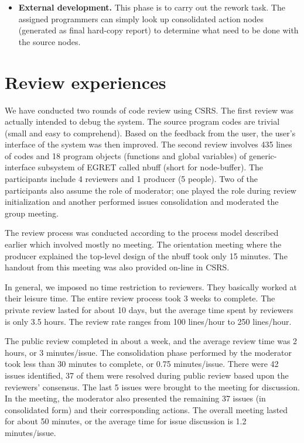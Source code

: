 \begin {itemize}
This phase is also used to generate or refine standard issues
by analyzing the identified errors as described in the previous section.

\item {\bf External development.}
This phase is to carry out the rework task. The assigned programmers can
simply look up consolidated action nodes (generated as final hard-copy
report) to determine what need to be done with the source nodes.

\end {itemize}

\section {Review experiences}

We have conducted two rounds of code review using CSRS.  The
first review was actually intended to debug the system. The
source program codes are trivial (small and easy to comprehend).  Based
on the feedback from the user, the user's interface of the system
was then improved. The second review involves 435 lines of 
codes and 18 program objects (functions and global variables) of
generic-interface subsystem of EGRET called nbuff (short for
node-buffer). The participants include 4 reviewers and 1 producer
(5 people).  Two of the participants also assume the
role of moderator; one played the role during review
initialization and another performed issues consolidation and
moderated the group meeting.

The review process was conducted according to the process model
described earlier which involved mostly no meeting.  The
orientation meeting where the producer explained the top-level
design of the nbuff took only 15 minutes. The handout from this
meeting was also provided on-line in CSRS.

In general, we imposed no time restriction to reviewers. They
basically worked at their leisure time.  The entire review
process took 3 weeks to complete. 
The private review lasted for about 10 days, but the average time
spent by reviewers is only 3.5 hours.  The review rate ranges
from 100 lines/hour to 250 lines/hour.
  
The public review completed in about a week, and the average
review time was 2 hours, or 3 minutes/issue.  The consolidation
phase performed by the moderator took less than 30 minutes to complete,
or 0.75 minutes/issue.
There were 42 issues identified, 37 of them were resolved during
public review based upon the reviewers' consensus.  The last 5
issues were brought to the meeting for discussion.  In the
meeting, the moderator also presented the remaining 37 issues (in
consolidated form) and their corresponding actions.  The overall meeting
lasted for about 50 minutes, or the average time for issue
discussion is 1.2 minutes/issue.

